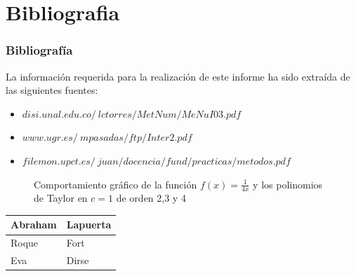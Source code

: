 \documentclass{beamer}
\newtheorem{descripcion de los experimentos}{\underline {Descripcion de los experimentos}}
\begin{document}
\section{Bibliografia}
\begin{frame}
 \frametitle{Bibliografía}

   La información requerida para la realización de este informe ha sido extraída de las siguientes fuentes:

  \begin{thebibliography}{10}
    \beamertemplatebookbibitems
\begin{itemize}
\item {\small $disi.unal.edu.co/~lctorres/MetNum/MeNuI03.pdf$}
\item {\small $www.ugr.es/~mpasadas/ftp/Inter2.pdf$}
\item {\small $filemon.upct.es/~juan/docencia/fund/practicas/metodos.pdf$}
\end {itemize}
  \end{thebibliography}
\end{frame}





\begin{frame}


\begin{figure}
  \caption{Comportamiento gráfico de la función $f(x)=\frac{1}{4x}$ y los polinomios de Taylor en $c=1$ de orden 2,3 y 4 }
\end{figure}
\end{frame}





\begin{frame}




\begin{tabular}{|l|l|}
\hline
Abraham & Lapuerta\\
\hline
Roque & Fort\\
\hline
Eva & Dirse\\
\hline
\end{tabular}



%

\end{frame}
\end{document}
